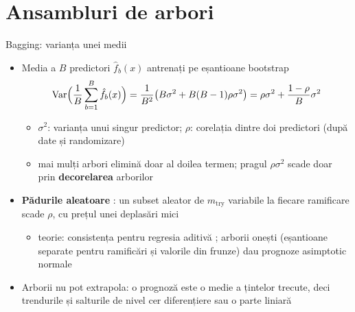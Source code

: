 \section{Ansambluri de arbori}

\begin{frame}{Bagging: varianța unei medii}
\itemsize{\small}
\begin{itemize}
    \item Media a $B$ predictori $\hat f_b(x)$ antrenați pe eșantioane bootstrap 
    \[ \text{Var}\Big(\frac1B\sum_{b=1}^B\hat f_b(x)\Big) = \frac1{B^2}\big(B\sigma^2 + B(B - 1)\rho\sigma^2\big) = \rho\sigma^2 + \frac{1 - \rho}B\sigma^2 \]
    \begin{itemize}
        \item $\sigma^2$: varianța unui singur predictor; $\rho$: corelația dintre doi predictori (după date și randomizare)
        \item mai mulți arbori elimină doar al doilea termen; pragul $\rho\sigma^2$ scade doar prin \textbf{decorelarea} arborilor
    \end{itemize}
    \item \textbf{Pădurile aleatoare} : un subset aleator de $m_{\mathrm{try}}$ variabile la fiecare ramificare scade $\rho$, cu prețul unei deplasări mici
    \begin{itemize}
        \item teorie: consistența pentru regresia aditivă ; arborii onești (eșantioane separate pentru ramificări și valorile din frunze) dau prognoze asimptotic normale 
    \end{itemize}
    \item Arborii nu pot extrapola: o prognoză este o medie a țintelor trecute, deci trendurile și salturile de nivel cer diferențiere sau o parte liniară
\end{itemize}
\end{frame}

